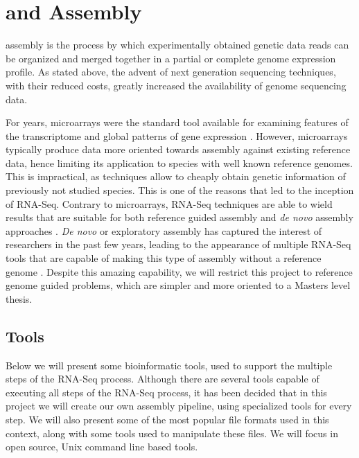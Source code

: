 \section{\rnaseq{} and \Trans{} Assembly}\label{sec:assembly}

\Trans{} assembly is the process by which experimentally obtained genetic data
reads can be organized and merged together in a partial or complete genome
expression profile. As stated above, the advent of next generation sequencing
techniques, with their reduced costs, greatly increased the availability of
genome sequencing data.

For years, microarrays were the standard tool available for examining features
of the transcriptome and global patterns of gene expression \cite{Wolf2013}.
However, microarrays typically produce data more oriented towards assembly
against existing reference data, hence limiting its application to species with
well known reference genomes. This is impractical, as \ngs{} techniques allow to
cheaply obtain genetic information of previously not studied species. This is
one of the reasons that led to the inception of RNA-Seq. Contrary to
microarrays, RNA-Seq techniques are able to wield results that are suitable for
both reference guided assembly and \textit{de novo} assembly approaches
\cite{Wilhelm2009}. \textit{De novo} or exploratory assembly has captured the
interest of researchers in the past few years, leading to the appearance of
multiple RNA-Seq tools that are capable of making this type of assembly without
a reference genome \cite{nuno11:assemblathon}. Despite this amazing capability,
we will restrict this project to reference genome guided problems, which are
simpler and more oriented to a Masters level thesis.

\subsection{\rnaseq{} Tools}\label{sec:seqtools}

Below we will present some bioinformatic tools, used to support the multiple
steps of the RNA-Seq process. Although there are several tools capable of
executing all steps of the RNA-Seq process, it has been decided that in this
project we will create our own assembly pipeline, using specialized tools for
every step. We will also present some of the most popular file formats used in
this context, along with some tools used to manipulate these files. We will
focus in open source, Unix command line based tools.

